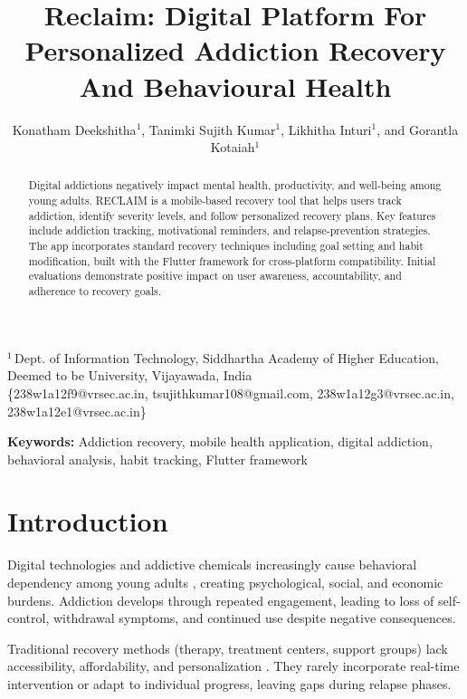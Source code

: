 \documentclass[a4paper]{article}
\begin{document}
\title{Reclaim: Digital Platform For Personalized Addiction Recovery And Behavioural Health}

\author{Konatham Deekshitha$^{1}$, Tanimki Sujith Kumar$^{1}$, Likhitha Inturi$^{1}$, and Gorantla Kotaiah$^{1}$}

\date{}

\maketitle

\noindent$^{1}$\,Dept. of Information Technology, Siddhartha Academy of Higher Education, Deemed to be University, Vijayawada, India\\\noindent\small\{238w1a12f9@vrsec.ac.in, tsujithkumar108@gmail.com, 238w1a12g3@vrsec.ac.in, 238w1a12e1@vrsec.ac.in\}

\begin{abstract}
Digital addictions negatively impact mental health, productivity, and well-being among young adults. RECLAIM is a mobile-based recovery tool that helps users track addiction, identify severity levels, and follow personalized recovery plans. Key features include addiction tracking, motivational reminders, and relapse-prevention strategies. The app incorporates standard recovery techniques including goal setting and habit modification, built with the Flutter framework for cross-platform compatibility. Initial evaluations demonstrate positive impact on user awareness, accountability, and adherence to recovery goals.
\end{abstract}

\noindent\textbf{Keywords:} Addiction recovery, mobile health application, digital addiction, behavioral analysis, habit tracking, Flutter framework

\section{Introduction}\label{sec:intro}
Digital technologies and addictive chemicals increasingly cause behavioral dependency among young adults \cite{b1}, creating psychological, social, and economic burdens. Addiction develops through repeated engagement, leading to loss of self-control, withdrawal symptoms, and continued use despite negative consequences.

Traditional recovery methods (therapy, treatment centers, support groups) lack accessibility, affordability, and personalization \cite{b4,b5,b6}. They rarely incorporate real-time intervention or adapt to individual progress, leaving gaps during relapse phases.
\end{document}
